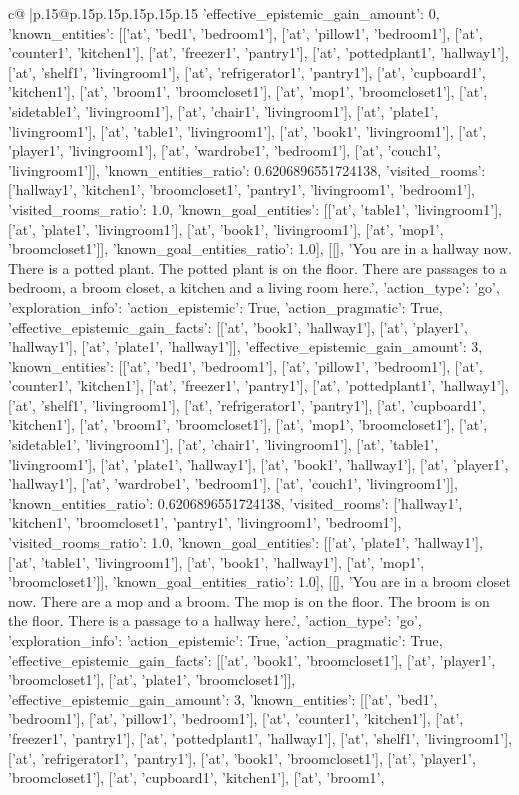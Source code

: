 \documentclass{article}
\begin{document}
{\begin{supertabular}{c@{$\;$}|p{.15\linewidth}@{}p{.15\linewidth}p{.15\linewidth}p{.15\linewidth}p{.15\linewidth}p{.15\linewidth}}
{{{'effective_epistemic_gain_amount': 0, 'known_entities': [['at', 'bed1', 'bedroom1'], ['at', 'pillow1', 'bedroom1'], ['at', 'counter1', 'kitchen1'], ['at', 'freezer1', 'pantry1'], ['at', 'pottedplant1', 'hallway1'], ['at', 'shelf1', 'livingroom1'], ['at', 'refrigerator1', 'pantry1'], ['at', 'cupboard1', 'kitchen1'], ['at', 'broom1', 'broomcloset1'], ['at', 'mop1', 'broomcloset1'], ['at', 'sidetable1', 'livingroom1'], ['at', 'chair1', 'livingroom1'], ['at', 'plate1', 'livingroom1'], ['at', 'table1', 'livingroom1'], ['at', 'book1', 'livingroom1'], ['at', 'player1', 'livingroom1'], ['at', 'wardrobe1', 'bedroom1'], ['at', 'couch1', 'livingroom1']], 'known_entities_ratio': 0.6206896551724138, 'visited_rooms': ['hallway1', 'kitchen1', 'broomcloset1', 'pantry1', 'livingroom1', 'bedroom1'], 'visited_rooms_ratio': 1.0, 'known_goal_entities': [['at', 'table1', 'livingroom1'], ['at', 'plate1', 'livingroom1'], ['at', 'book1', 'livingroom1'], ['at', 'mop1', 'broomcloset1']], 'known_goal_entities_ratio': 1.0}}], [[], 'You are in a hallway now. There is a potted plant. The potted plant is on the floor. There are passages to a bedroom, a broom closet, a kitchen and a living room here.', {'action_type': 'go', 'exploration_info': {'action_epistemic': True, 'action_pragmatic': True, 'effective_epistemic_gain_facts': [['at', 'book1', 'hallway1'], ['at', 'player1', 'hallway1'], ['at', 'plate1', 'hallway1']], 'effective_epistemic_gain_amount': 3, 'known_entities': [['at', 'bed1', 'bedroom1'], ['at', 'pillow1', 'bedroom1'], ['at', 'counter1', 'kitchen1'], ['at', 'freezer1', 'pantry1'], ['at', 'pottedplant1', 'hallway1'], ['at', 'shelf1', 'livingroom1'], ['at', 'refrigerator1', 'pantry1'], ['at', 'cupboard1', 'kitchen1'], ['at', 'broom1', 'broomcloset1'], ['at', 'mop1', 'broomcloset1'], ['at', 'sidetable1', 'livingroom1'], ['at', 'chair1', 'livingroom1'], ['at', 'table1', 'livingroom1'], ['at', 'plate1', 'hallway1'], ['at', 'book1', 'hallway1'], ['at', 'player1', 'hallway1'], ['at', 'wardrobe1', 'bedroom1'], ['at', 'couch1', 'livingroom1']], 'known_entities_ratio': 0.6206896551724138, 'visited_rooms': ['hallway1', 'kitchen1', 'broomcloset1', 'pantry1', 'livingroom1', 'bedroom1'], 'visited_rooms_ratio': 1.0, 'known_goal_entities': [['at', 'plate1', 'hallway1'], ['at', 'table1', 'livingroom1'], ['at', 'book1', 'hallway1'], ['at', 'mop1', 'broomcloset1']], 'known_goal_entities_ratio': 1.0}}], [[], 'You are in a broom closet now. There are a mop and a broom. The mop is on the floor. The broom is on the floor. There is a passage to a hallway here.', {'action_type': 'go', 'exploration_info': {'action_epistemic': True, 'action_pragmatic': True, 'effective_epistemic_gain_facts': [['at', 'book1', 'broomcloset1'], ['at', 'player1', 'broomcloset1'], ['at', 'plate1', 'broomcloset1']], 'effective_epistemic_gain_amount': 3, 'known_entities': [['at', 'bed1', 'bedroom1'], ['at', 'pillow1', 'bedroom1'], ['at', 'counter1', 'kitchen1'], ['at', 'freezer1', 'pantry1'], ['at', 'pottedplant1', 'hallway1'], ['at', 'shelf1', 'livingroom1'], ['at', 'refrigerator1', 'pantry1'], ['at', 'book1', 'broomcloset1'], ['at', 'player1', 'broomcloset1'], ['at', 'cupboard1', 'kitchen1'], ['at', 'broom1', }}}
\end{supertabular}}
\end{document}
